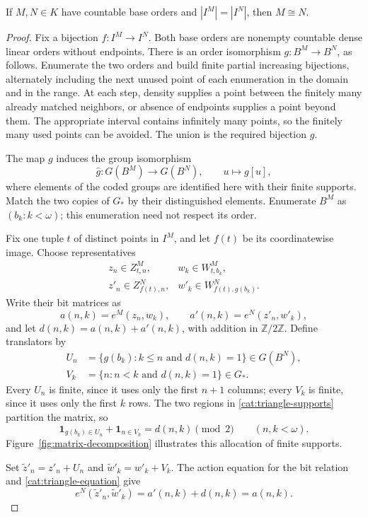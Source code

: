 \begin{lemma}\label{cat:countable-base}
If $M,N\in K$ have countable base orders and $|I^M|=|I^N|$, then
$M\cong N$.
\end{lemma}

\begin{proof}
Fix a bijection $f:I^M\to I^N$. Both base orders are nonempty
countable dense linear orders without endpoints. There is an order
isomorphism $g:B^M\to B^N$, as follows. Enumerate the two orders and
build finite partial increasing bijections, alternately including the
next unused point of each enumeration in the domain and in the range.
At each step, density supplies a point between the finitely many
already matched neighbors, or absence of endpoints supplies a point
beyond them. The appropriate interval contains infinitely many
points, so the finitely many used points can be avoided. The union
is the required bijection $g$.

The map $g$ induces the group isomorphism
\[
 \widehat g:G(B^M)\longrightarrow G(B^N),
 \qquad u\longmapsto g[u],
\]
where elements of the coded groups are identified here with their
finite supports. Match the two copies of $G_*$ by their distinguished
elements. Enumerate $B^M$ as $(b_k:k<\omega)$; this enumeration need
not respect its order.

Fix one tuple $t$ of distinct points in $I^M$, and let $f(t)$ be its
coordinatewise image. Choose representatives
\[
 \begin{array}{ll}
 z_n\in Z^M_{t,n},&w_k\in W^M_{t,b_k},\\
 z'_n\in Z^N_{f(t),n},&w'_k\in W^N_{f(t),g(b_k)}.
 \end{array}
\]
Write their bit matrices as
\[
 a(n,k)=e^M(z_n,w_k),\qquad
 a'(n,k)=e^N(z'_n,w'_k),
\]
and let $d(n,k)=a(n,k)+a'(n,k)$, with addition in $\mathbb Z/2\mathbb Z$.
Define translators by
\begin{equation}\label{cat:triangle-supports}
 \begin{split}
 U_n&=\{g(b_k):k\le n\text{ and }d(n,k)=1\}\in G(B^N),\\
 V_k&=\{n:n<k\text{ and }d(n,k)=1\}\in G_*.
 \end{split}
\end{equation}
Every $U_n$ is finite, since it uses only the first $n+1$ columns;
every $V_k$ is finite, since it uses only the first $k$ rows. The two
regions in \eqref{cat:triangle-supports} partition the matrix, so
\begin{equation}\label{cat:triangle-equation}
 \boldsymbol 1_{g(b_k)\in U_n}
       +\boldsymbol 1_{n\in V_k}=d(n,k)\pmod2
       \qquad(n,k<\omega).
\end{equation}
Figure~\ref{fig:matrix-decomposition} illustrates this allocation of
finite supports.

Set $\widetilde z'_n=z'_n+U_n$ and
$\widetilde w'_k=w'_k+V_k$. The action equation for the bit relation
and \eqref{cat:triangle-equation} give
\[
 e^N(\widetilde z'_n,\widetilde w'_k)
     =a'(n,k)+d(n,k)=a(n,k).
\]


\end{proof}
